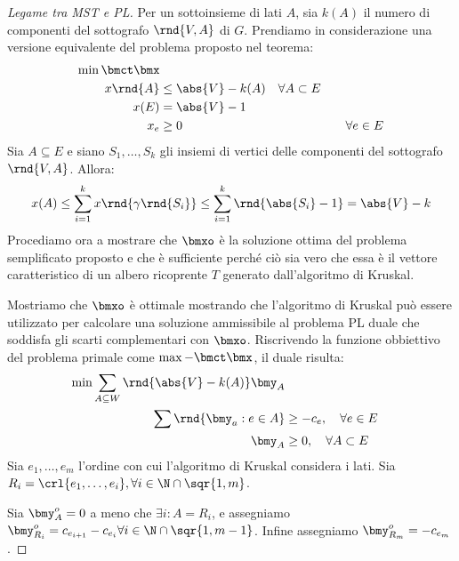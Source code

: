 \documentclass[\main/main.tex]{subfiles}
\begin{document}
\begin{proof}[Legame tra MST e PL]
  Per un sottoinsieme di lati \(A\), sia \(k(A)\) il numero di componenti del sottografo \(\rnd{V, A}\) di \(G\). Prendiamo in considerazione una versione equivalente del problema proposto nel teorema:
  \begin{align*}
    \min \bmct\bmx                                                                   \\
    x\rnd{A} & \leq \abs{V} - k(A) \quad \forall A \subset E                         \\
    x(E)     & = \abs{V} -1                                                          \\
    x_e      & \geq 0                                        & \quad \forall e \in E
  \end{align*}
  Sia \(A \subseteq E\) e siano \(S_1, \ldots, S_k\) gli insiemi di vertici delle componenti del sottografo \(\rnd{V, A}\). Allora:
  \[
    x(A) \leq \sum_{i=1}^k x\rnd{\gamma\rnd{S_i}} \leq \sum_{i=1}^k \rnd{\abs{S_i}-1} = \abs{V} - k
  \]
  Procediamo ora a mostrare che \(\bmxo\) è la soluzione ottima del problema semplificato proposto e che è sufficiente perché ciò sia vero che essa è il vettore caratteristico di un albero ricoprente \(T\) generato dall'algoritmo di Kruskal.

  Mostriamo che \(\bmxo\) è ottimale mostrando che l'algoritmo di Kruskal può essere utilizzato per calcolare una soluzione ammissibile al problema PL duale che soddisfa gli scarti complementari con \(\bmxo\). Riscrivendo la funzione obbiettivo del problema primale come \(\max -\bmct\bmx \), il duale risulta:
  \begin{align*}
    \min \sum_{A \subseteq W} \rnd{\abs{V} - k(A)}\bmy_A           \\
    \sum \rnd{\bmy_a: e \in A} & \geq -c_e, \quad \forall e \in E  \\
    \bmy_A                     & \geq 0, \quad \forall A \subset E
  \end{align*}
  Sia \(e_1, \ldots, e_m\) l'ordine con cui l'algoritmo di Kruskal considera i lati. Sia \(R_i = \crl{e_1, \ldots, e_i}, \forall i \in \N \cap \sqr{1, m}\).

  Sia \(\bmy_A^o=0\) a meno che \(\exists i: A = R_i\), e assegniamo \(\bmy^o_{R_i} = c_{e_{i+1}} - c_{e_{i}} \forall i \in \N \cap \sqr{1, m-1}\). Infine assegniamo \(\bmy^o_{R_m} = -c_{e_m}\).


\end{proof}
\end{document}
